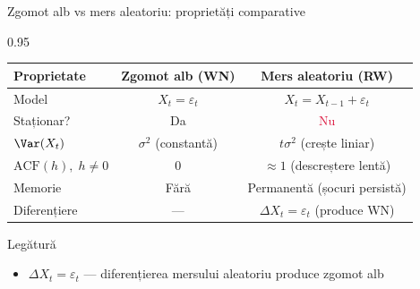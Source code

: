 \documentclass[9pt, aspectratio=169, t]{beamer}
\begin{document}
\begin{frame}{Zgomot alb vs mers aleatoriu: proprietăți comparative}
    \begin{cminipage}{0.95\textwidth}
        \vspace{-0.2cm}
        {\footnotesize
        \begin{center}
        \renewcommand{\arraystretch}{1.25}
        \begin{tabular}{l c c}
            \hline
            \textbf{Proprietate} & \textbf{Zgomot alb (WN)} & \textbf{Mers aleatoriu (RW)} \\
            \hline
            Model & $X_t = \varepsilon_t$ & $X_t = X_{t-1} + \varepsilon_t$ \\
            Staționar? & \textcolor{Forest}{Da} & \textcolor{Crimson}{Nu} \\
            $\Var(X_t)$ & $\sigma^2$ (constantă) & $t\sigma^2$ (crește liniar) \\
            $\mathrm{ACF}(h),\; h \neq 0$ & $0$ & $\approx 1$ (descreștere lentă) \\
            Memorie & Fără & Permanentă (șocuri persistă) \\
            Diferențiere & --- & $\Delta X_t = \varepsilon_t$ (produce WN) \\
            \hline
        \end{tabular}
        \end{center}
        \vspace{0.1cm}
        \begin{block}{Legătură}
            \begin{itemize}\setlength{\itemsep}{0pt}
                \item $\Delta X_t = \varepsilon_t$ --- diferențierea mersului aleatoriu produce zgomot alb
            \end{itemize}
        \end{block}
        }
        \hfill{}
    \end{cminipage}
\end{frame}
\end{document}
